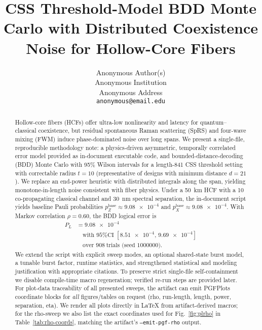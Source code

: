 \documentclass{article}
\title{CSS Threshold-Model BDD Monte Carlo with Distributed Coexistence Noise for Hollow-Core Fibers}
\author{%
  Anonymous Author(s) \\
  Anonymous Institution \\
  Anonymous Address \\
  \texttt{anonymous@email.edu} \\
}
\newcommand{\nexact}[1]{#1}
\newcommand{\val}[1]{\num[round-mode=figures,round-precision=3]{#1}}
\newcommand{\simn}{841}
\newcommand{\simL}{50}
\newcommand{\simpcl}{10}
\newcommand{\simsep}{30}
\newcommand{\simpz}{9.08e-4}
\newcommand{\simpx}{9.08e-4}
\newcommand{\simrhoB}{0.60}
\newcommand{\simpLB}{9.08e-4}
\newcommand{\simpLBlo}{8.51e-4}
\newcommand{\simpLBhi}{9.69e-4}
\newcommand{\simtrials}{908}
\newcommand{\simseed}{1000000}
\begin{document}
\maketitle

\begin{abstract}
Hollow-core fibers (HCFs) offer ultra-low nonlinearity and latency for quantum--classical coexistence, but residual spontaneous Raman scattering (SpRS) and four-wave mixing (FWM) induce phase-dominated noise over long spans. We present a single-file, reproducible methodology note: a physics-driven asymmetric, temporally correlated error model provided as in-document executable code, and bounded-distance-decoding (BDD) Monte Carlo with 95\% Wilson intervals for a length-\nexact{\simn} CSS threshold setting with correctable radius $t=10$ (representative of designs with minimum distance $d=21$). We replace an end-power heuristic with distributed integrals along the span, yielding monotone-in-length noise consistent with fiber physics. Under a \SI{\simL}{\kilo\meter} HCF with a \SI{\simpcl}{\dBm} co-propagating classical channel and \SI{\simsep}{\nano\meter} spectral separation, the in-document script yields baseline Pauli probabilities $p_Z^{\text{base}}\approx \allowbreak \val{\simpz}$ and $p_X^{\text{base}}\approx \allowbreak \val{\simpx}$. With Markov correlation $\rho=\nexact{\simrhoB}$, the BDD logical error is
\begin{align*}
P_L &= \val{\simpLB} \\
&\quad \text{with 95\% CI }[\val{\simpLBlo},\,\val{\simpLBhi}] \\
&\quad \text{over } \nexact{\simtrials}\ \text{trials (seed \nexact{\simseed})}.
\end{align*}
We extend the script with explicit sweep modes, an optional shared-state burst model, a tunable burst factor, runtime statistics, and strengthened statistical and modeling justification with appropriate citations. To preserve strict single-file self-containment we disable compile-time macro regeneration; verified re-run steps are provided later. For plot-data traceability of all presented sweeps, the artifact can emit PGFPlots coordinate blocks for \emph{all} figures/tables on request (rho, run-length, length, power, separation, eta). We render all plots directly in LaTeX from artifact-derived macros; for the rho-sweep we also list the exact coordinates used for Fig.~\ref{fig:plrho} in Table~\ref{tab:rho-coords}, matching the artifact's \texttt{--emit-pgf-rho} output.
\end{abstract}
\end{document}
